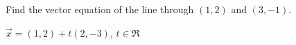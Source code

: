 
\begin{Exercise}[
name={},
title={}, 
difficulty=0,
origin={\cite{SM}}]

Find the vector equation of the line through $(1,2)$ and $(3,-1)$.

\end{Exercise}

\begin{Answer}
$\vec{x} = (1,2)+t(2,-3)$, $t\in\Re$
\end{Answer}
